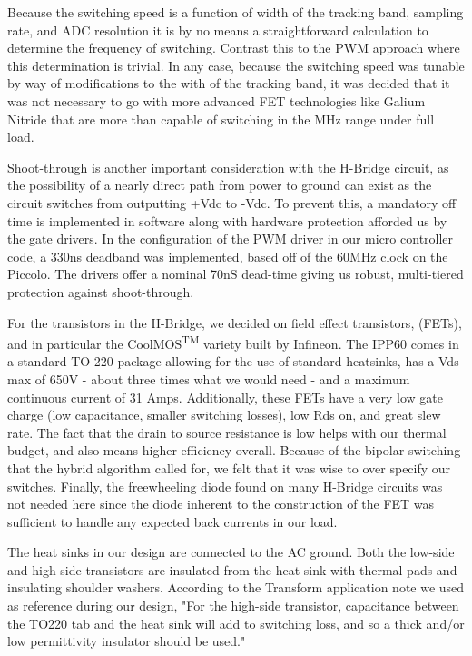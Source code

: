 Because the switching speed is a function of width of the tracking band, sampling rate, and ADC resolution it is by no means a straightforward calculation to determine the frequency of switching. Contrast this to the PWM approach where this determination is trivial. In any case, because the switching speed was tunable by way of modifications to the with of the tracking band, it was decided that it was not necessary to go with more advanced FET technologies like Galium Nitride that are more than capable of switching in the MHz range under full load. 

Shoot-through is another important consideration with the H-Bridge circuit, as the possibility of a nearly direct path from power to ground can exist as the circuit switches from outputting +Vdc to -Vdc. To prevent this, a mandatory off time is implemented in software along with  hardware protection afforded us by the gate drivers. In the configuration of the PWM driver in our micro controller code, a 330ns deadband was implemented, based off of the 60MHz clock on the Piccolo. The drivers offer a nominal 70nS dead-time giving us robust, multi-tiered protection against shoot-through. 

For the transistors in the H-Bridge, we decided on field effect transistors, (FETs), and in particular the CoolMOS\textsuperscript{TM}
variety built by Infineon. The IPP60 comes in a standard TO-220 package allowing for the use of standard heatsinks, has a Vds max of 650V - about three times what we would need - and a maximum continuous current of 31 Amps. Additionally, these FETs have a very low gate charge (low capacitance, smaller switching losses), low Rds on, and great slew rate. The fact that the drain to source resistance is low helps with our thermal budget, and also means higher efficiency overall. Because of the bipolar switching that the hybrid algorithm called for, we felt that it was wise to over specify our switches. Finally, the freewheeling diode found on many H-Bridge circuits was not needed here since the diode inherent to the construction of the FET was sufficient to handle any expected back currents in our load. 

The heat sinks in our design are connected to the AC ground. Both the low-side and high-side transistors are insulated from the heat sink with thermal pads and insulating shoulder washers. According to the Transform application note we used as reference during our design, "For the high-side transistor, capacitance between the TO220 tab and the heat sink will add to switching loss, and so a thick and/or low permittivity insulator should be used."\cite{transphorm}

